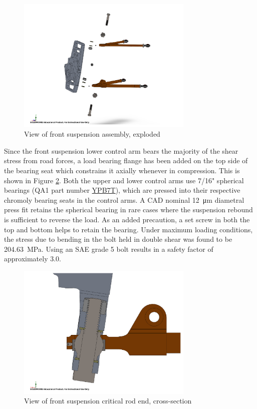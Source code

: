 \documentclass[10pt]{article}
\begin{document}
\begin{figure}[H]
\centering
\includegraphics[width=0.75\textwidth]{figures/front-suspension-exploded}
\caption{View of front suspension assembly, exploded}
\label{fig:front-suspension-exploded}
\end{figure}

Since the front suspension lower control arm bears the majority of the shear stress from road forces, a load bearing flange has been added on the top side of the bearing seat which constrains it axially whenever in compression. This is shown in Figure \ref{fig:front-suspension-cross-section}. Both the upper and lower control arms use 7/16" spherical bearings (QA1 part number \href{https://www.qa1.net/rod-ends-and-related/spherical-bearings/ypb-t-high-misalignment-stainless-steel-series}{YPB7T}), which are pressed into their respective chromoly bearing seats in the control arms. A CAD nominal \SI{12}{\micro\metre} diametral press fit retains the spherical bearing in rare cases where the suspension rebound is sufficient to reverse the load. As an added precaution, a set screw in both the top and bottom helps to retain the bearing. Under maximum loading conditions, the stress due to bending in the bolt held in double shear was found to be \SI{204.63}{\mega\pascal}. Using an SAE grade 5 bolt results in a safety factor of approximately 3.0.

\begin{figure}[H]
\centering
\includegraphics[width=0.75\textwidth]{figures/front-suspension-cross-section}
\caption{View of front suspension critical rod end, cross-section}
\label{fig:front-suspension-cross-section}
\end{figure}
\end{document}
